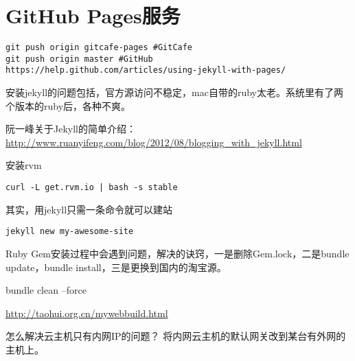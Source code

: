 \section{GitHub Pages服务}

\begin{verbatim}
git push origin gitcafe-pages #GitCafe
git push origin master #GitHub
https://help.github.com/articles/using-jekyll-with-pages/
\end{verbatim}


安装jekyll的问题包括，官方源访问不稳定，mac自带的ruby太老。系统里有了两个版本的ruby后，各种不爽。


阮一峰关于Jekyll的简单介绍：
\url{http://www.ruanyifeng.com/blog/2012/08/blogging_with_jekyll.html}

安装rvm
\begin{verbatim}
curl -L get.rvm.io | bash -s stable
\end{verbatim}

其实，用jekyll只需一条命令就可以建站
\begin{verbatim}
jekyll new my-awesome-site
\end{verbatim}

Ruby Gem安装过程中会遇到问题，解决的诀窍，一是删除Gem.lock，二是bundle update，bundle install，三是更换到国内的淘宝源。

bundle clean --force


\url{http://taohui.org.cn/mywebbuild.html}


怎么解决云主机只有内网IP的问题？
将内网云主机的默认网关改到某台有外网的主机上。